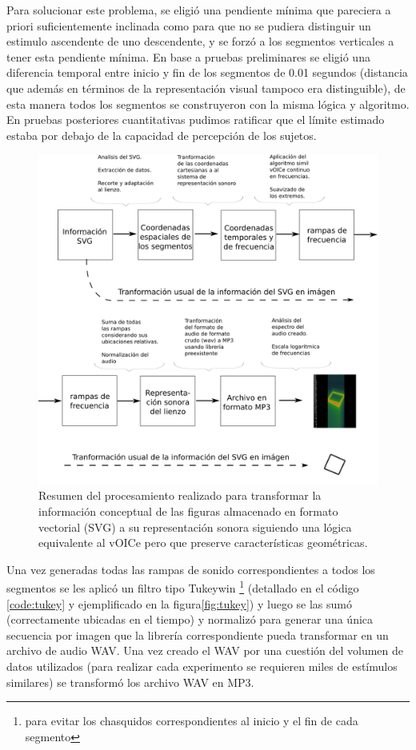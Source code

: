 \documentclass{article}
\begin{document}
    Para solucionar este problema, se eligió una pendiente mínima que pareciera a priori suficientemente inclinada como para que no se pudiera distinguir un estimulo ascendente de uno descendente, y se forzó a los segmentos verticales a tener esta pendiente mínima. En base a pruebas preliminares se eligió una diferencia temporal entre inicio y fin de los segmentos de 0.01 segundos (distancia que además en términos de la representación visual tampoco era distinguible), de esta manera todos los segmentos se construyeron con la misma lógica y algoritmo. En pruebas posteriores cuantitativas pudimos ratificar que el límite estimado estaba por debajo de la capacidad de percepción de los sujetos. 
    
    \begin{figure}
        \center
        \includegraphics[width=\textwidth]{Imagenes/diagramaSVG2.png}
        \caption{Resumen del procesamiento realizado para transformar la información conceptual de las figuras almacenado en formato vectorial (SVG) a su representación sonora siguiendo una lógica equivalente al vOICe pero que preserve características geométricas.}
        \label{fig:diagramaSVG}
    \end{figure}
    
    Una vez generadas todas las rampas de sonido correspondientes a todos los segmentos se les aplicó un filtro tipo Tukeywin \footnote{para evitar los chasquidos correspondientes al inicio y el fin de cada segmento} (detallado en el código \ref{code:tukey} y ejemplificado en la figura\ref{fig:tukey}) y luego se las sumó (correctamente ubicadas en el tiempo) y normalizó para generar una única secuencia por imagen que la librería correspondiente pueda transformar en un archivo de audio WAV. Una vez creado el WAV por una cuestión del volumen de datos utilizados (para realizar cada experimento se requieren miles de estímulos similares) se transformó los archivo WAV en MP3. 
\end{document}
